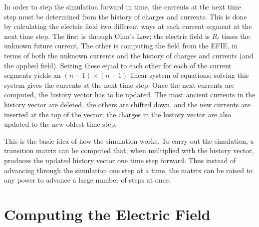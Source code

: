 \documentclass{article}
\begin{document}
In order to step the simulation forward in time, the currents at the next time step must be determined from the history of charges and currents. This is done by calculating the electric field two different ways at each current segment at the next time step. The first is through Ohm's Law; the electric field is $R_l$ times the unknown future current. The other is computing the field from the EFIE, in terms of both the unknown currents and the history of charges and currents (and the applied field). Setting these equal to each other for each of the current segments yields an $(n-1)\times(n-1)$ linear system of equations; solving this system gives the currents at the next time step. Once the next currents are computed, the history vector has to be updated. The most ancient currents in the history vector are deleted, the others are shifted down, and the new currents are inserted at the top of the vector; the charges in the history vector are also updated to the new oldest time step.

This is the basic idea of how the simulation works. To carry out the simulation, a transition matrix can be computed that, when multiplied with the history vector, produces the updated history vector one time step forward. Thus instead of advancing through the simulation one step at a time, the matrix can be raised to any power to advance a large number of steps at once.

\section{Computing the Electric Field}
\end{document}
